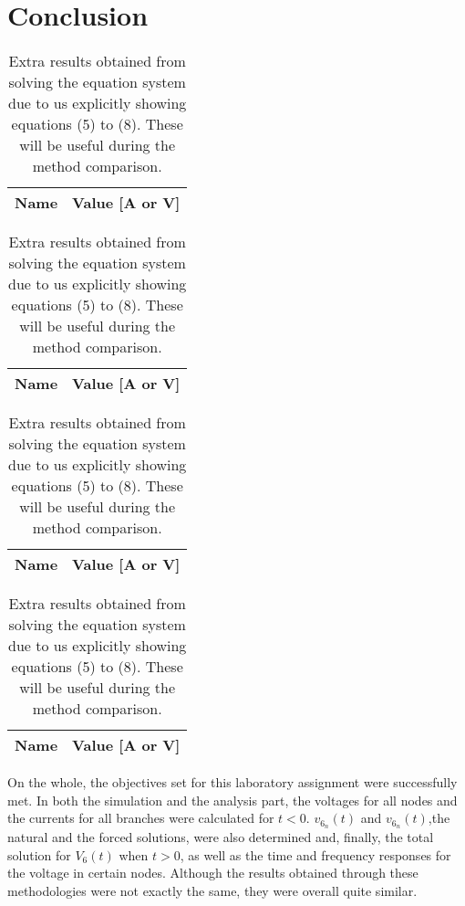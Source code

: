 
\section{Conclusion}
\label{sec:conclusion}

\begin{table}[H]
  \centering
  \begin{tabular}{|c|c|}
    \hline    
    {\bf Name} & {\bf Value [A or V]} \\ \hline
    
  \end{tabular}
  \begin{tabular}{|c|c|}
    \hline    
    {\bf Name} & {\bf Value [A or V]} \\ \hline
    
  \end{tabular}
  \caption{Extra results obtained from solving the equation system due to us explicitly showing equations (5) to (8). These will be useful during the method comparison.}
  \label{tab:mesh}
\end{table}

\begin{table}[H]
  \centering
  \begin{tabular}{|c|c|}
    \hline    
    {\bf Name} & {\bf Value [A or V]} \\ \hline
    
  \end{tabular}
  \begin{tabular}{|c|c|}
    \hline    
    {\bf Name} & {\bf Value [A or V]} \\ \hline
    
  \end{tabular}
  \caption{Extra results obtained from solving the equation system due to us explicitly showing equations (5) to (8). These will be useful during the method comparison.}
  \label{tab:mesh}
\end{table}


On the whole, the objectives set for this laboratory assignment were successfully met.
In both the simulation and the analysis part, the voltages for all nodes and the currents for all branches were calculated for $t<0$. $v_{6_n}(t)$ and $v_{6_n}(t)$,the natural and the forced solutions, were also determined and, finally, the total solution for $V_6(t)$ when $t>0$, as well as the time and frequency responses for the voltage in certain nodes. Although the results obtained through these methodologies were not exactly the same, they were overall quite similar.



